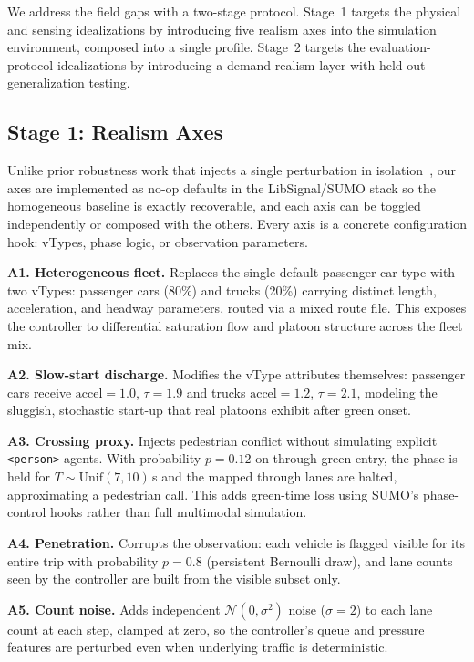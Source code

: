 \documentclass[conference]{IEEEtran}
\begin{document}
We address the field gaps with a two-stage protocol. Stage~1 targets the physical and sensing idealizations by introducing five realism axes into the simulation environment, composed into a single profile. Stage~2 targets the evaluation-protocol idealizations by introducing a demand-realism layer with held-out generalization testing.

\subsection{Stage 1: Realism Axes}

Unlike prior robustness work that injects a single perturbation in isolation~\cite{tan2020robust, rodrigues2019towards}, our axes are implemented as no-op defaults in the LibSignal/SUMO stack so the homogeneous baseline is exactly recoverable, and each axis can be toggled independently or composed with the others. Every axis is a concrete configuration hook: vTypes, phase logic, or observation parameters.

\textbf{A1. Heterogeneous fleet.} Replaces the single default passenger-car type with two vTypes: passenger cars (80\%) and trucks (20\%) carrying distinct length, acceleration, and headway parameters, routed via a mixed route file. This exposes the controller to differential saturation flow and platoon structure across the fleet mix.

\textbf{A2. Slow-start discharge.} Modifies the vType attributes themselves: passenger cars receive $\text{accel}{=}1.0$, $\tau{=}1.9$ and trucks $\text{accel}{=}1.2$, $\tau{=}2.1$, modeling the sluggish, stochastic start-up that real platoons exhibit after green onset.

\textbf{A3. Crossing proxy.} Injects pedestrian conflict without simulating explicit \texttt{<person>} agents. With probability $p{=}0.12$ on through-green entry, the phase is held for $T \sim \mathrm{Unif}(7,10)$\,s and the mapped through lanes are halted, approximating a pedestrian call. This adds green-time loss using SUMO's phase-control hooks rather than full multimodal simulation.

\textbf{A4. Penetration.} Corrupts the observation: each vehicle is flagged visible for its entire trip with probability $p{=}0.8$ (persistent Bernoulli draw), and lane counts seen by the controller are built from the visible subset only.

\textbf{A5. Count noise.} Adds independent $\mathcal{N}(0, \sigma^2)$ noise ($\sigma{=}2$) to each lane count at each step, clamped at zero, so the controller's queue and pressure features are perturbed even when underlying traffic is deterministic.
\end{document}

